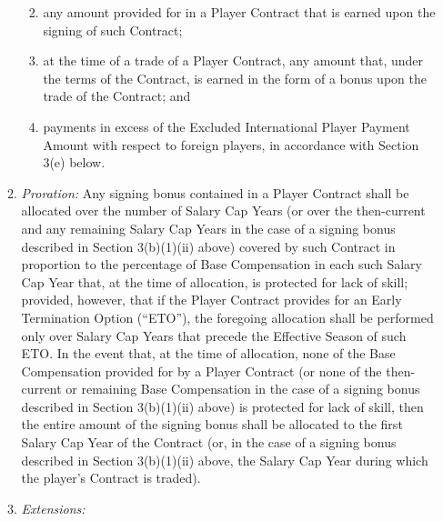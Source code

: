 \documentclass[
]{book}
\providecommand{\tightlist}{%
  \setlength{\itemsep}{0pt}\setlength{\parskip}{0pt}}
\begin{document}
\begin{enumerate}
\begin{enumerate}
    \begin{enumerate}
    \def\labelenumiii{(\roman{enumiii})}
    \tightlist
    \item
      any amount provided for in a Player Contract that is earned upon the signing of such Contract;
    \item
      at the time of a trade of a Player Contract, any amount that, under the terms of the Contract, is earned in the form of a bonus upon the trade of the Contract; and
    \item
      payments in excess of the Excluded International Player Payment Amount with respect to foreign players, in accordance with Section 3(e) below.
    \end{enumerate}
  \item
    \emph{Proration:} Any signing bonus contained in a Player Contract shall be allocated over the number of Salary Cap Years (or over the then-current and any remaining Salary Cap Years in the case of a signing bonus described in Section 3(b)(1)(ii) above) covered by such Contract in proportion to the percentage of Base Compensation in each such Salary Cap Year that, at the time of allocation, is protected for lack of skill; provided, however, that if the Player Contract provides for an Early Termination Option (``ETO''), the foregoing allocation shall be performed only over Salary Cap Years that precede the Effective Season of such ETO. In the event that, at the time of allocation, none of the Base Compensation provided for by a Player Contract (or none of the then-current or remaining Base Compensation in the case of a signing bonus described in Section 3(b)(1)(ii) above) is protected for lack of skill, then the entire amount of the signing bonus shall be allocated to the first Salary Cap Year of the Contract (or, in the case of a signing bonus described in Section 3(b)(1)(ii) above, the Salary Cap Year during which the player's Contract is traded).
  \item
    \emph{Extensions:}


\end{enumerate}
\end{enumerate}
\end{document}
